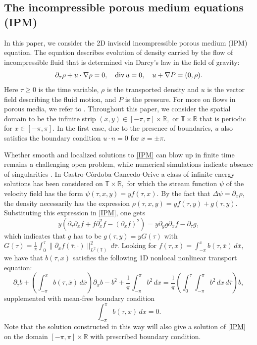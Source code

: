 \documentclass[12pt]{amsart}
\numberwithin{equation}{section}
\def\R{{\mathbb R}}
\def\T{{\mathbb T}}
\def\div{ \hbox{\rm div}\,  }
\numberwithin{equation}{section}
\begin{document}
\subsection{The incompressible porous medium equations (IPM)}



In this paper, we consider the 2D inviscid  incompressible porous medium (IPM) equation. The equation describes evolution of density carried by the flow of incompressible fluid that is determined via Darcy's law in the field of gravity:
\begin{equation}\label{IPM}
\partial_\tau \rho+ u\cdot\nabla \rho=0,\quad \div u=0,\quad  u+\nabla P=(0, \rho).
\end{equation}
Here $\tau\geq0$ is the time variable,  $\rho$ is the transported density and $u$ is the vector field describing the fluid motion, and $P$ is the pressure.  For more on flows in porous media, we refer to \cite{Be,N,FL}. Throughout this paper, we consider the spatial domain to be the infinite strip $(x, y)\in[-\pi, \pi]\times \R,$ or $\T\times \R$ that is periodic for $x\in [-\pi, \pi].$  In the first case,  due to the presence of boundaries,  $u$ also satisfies the boundary condition $u\cdot n=0$ for $x=\pm\pi.$


Whether smooth and localized solutions to \eqref{IPM} can blow up in finite time remains a challenging open problem, while numerical simulations indicate absence of singularities \cite{CGO}. In Castro-C\'{o}rdoba-Gancedo-Orive  \cite{CCGO}  a class of infinite energy solutions has been  considered on $\T\times \R,$  for which  the stream function $\psi$ of the velocity field has the form $\psi(\tau, x, y)=y f(\tau, x).$   By the fact that $\Delta \psi=  \partial_{x}\rho$,    the density necessarily has the expression $\rho(\tau, x, y)=yf(\tau, y)+ g(\tau, y).$  Substituting this expression in   \eqref{IPM},  one gets
\begin{equation*}
y (\partial_\tau \partial_{x} f+ f\partial_{x}^2 f-(\partial_{x} f)^2)=y\partial_{y} g \partial_{x}f - \partial_\tau g,
\end{equation*}
which indicates that  $g$ has to be $g(\tau, y)=y G(\tau)$
with $G(\tau)=\frac{1}{\pi}  \int_0^\tau \|\partial_{x} f(\bar\tau, \cdot)\|_{L^2(\mathbb{T})}^2\,d\bar\tau.$
 Looking for $f(\tau, x)=\int_{-\pi}^x b(\tau,  \bar x)\,d\bar x,$ we have that $b(\tau, x)$  satisfies the following  1D nonlocal nonlinear  transport equation:
\begin{equation}\label{eq-b}
\partial_\tau b+  \left(\int_{-\pi}^x b(\tau, \bar x) \,d\bar x\right) \partial_x b-b^2 +\frac{1}{\pi}  \int_{-\pi}^{\pi}b^2  \,dx=\frac{1}{\pi}\left( \int_{0}^\tau\int_{-\pi}^{\pi}b^2\,dx\,d\bar\tau \right) b,  
\end{equation}
supplemented with mean-free boundary condition 
\begin{equation}\label{mean-free-b}
\int_{-\pi}^\pi b(\tau, x)\,dx=0.
\end{equation}
Note that the solution constructed in this way will also give  a solution of  \eqref{IPM} on the domain  $[-\pi, \pi]\times \R$ with prescribed boundary condition. 
\medskip
\end{document}
